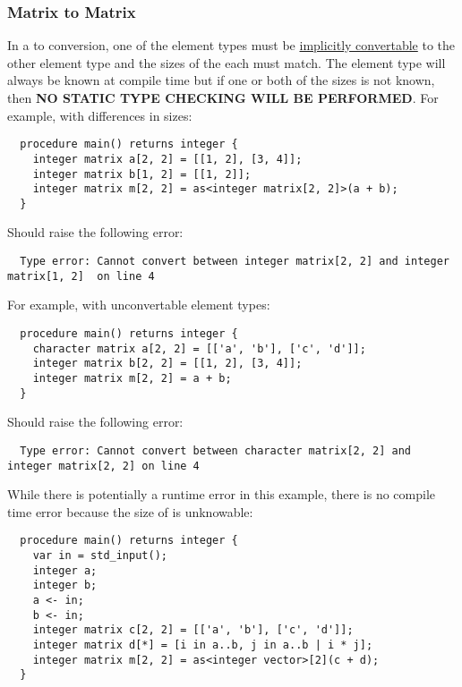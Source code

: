 \documentclass[../gazprea.tex]{subfiles}
\begin{document}
\subsubsection{Matrix to Matrix}
\label{sssec:error_ops_mtom}
In a  to  conversion, one of the element types must be
\hyperref[sec:typePromotion]{implicitly convertable} to the other element type and the sizes of the
each  must match. The element type will always be known at compile time but if one or
both of the sizes is not known, then \textbf{NO STATIC TYPE CHECKING WILL BE PERFORMED}. For
example, with differences in sizes:
\begin{lstlisting}
  procedure main() returns integer {
    integer matrix a[2, 2] = [[1, 2], [3, 4]];
    integer matrix b[1, 2] = [[1, 2]];
    integer matrix m[2, 2] = as<integer matrix[2, 2]>(a + b);
  }
\end{lstlisting}

Should raise the following error:
\begin{lstlisting}
  Type error: Cannot convert between integer matrix[2, 2] and integer matrix[1, 2]  on line 4
\end{lstlisting}

For example, with unconvertable element types:
\begin{lstlisting}
  procedure main() returns integer {
    character matrix a[2, 2] = [['a', 'b'], ['c', 'd']];
    integer matrix b[2, 2] = [[1, 2], [3, 4]];
    integer matrix m[2, 2] = a + b;
  }
\end{lstlisting}

Should raise the following error:
\begin{lstlisting}
  Type error: Cannot convert between character matrix[2, 2] and integer matrix[2, 2] on line 4
\end{lstlisting}

While there is potentially a runtime error in this example, there is no compile time error because
the size of  is unknowable:
\begin{lstlisting}
  procedure main() returns integer {
    var in = std_input();
    integer a;
    integer b;
    a <- in;
    b <- in;
    integer matrix c[2, 2] = [['a', 'b'], ['c', 'd']];
    integer matrix d[*] = [i in a..b, j in a..b | i * j];
    integer matrix m[2, 2] = as<integer vector>[2](c + d);
  }
\end{lstlisting}
\end{document}
